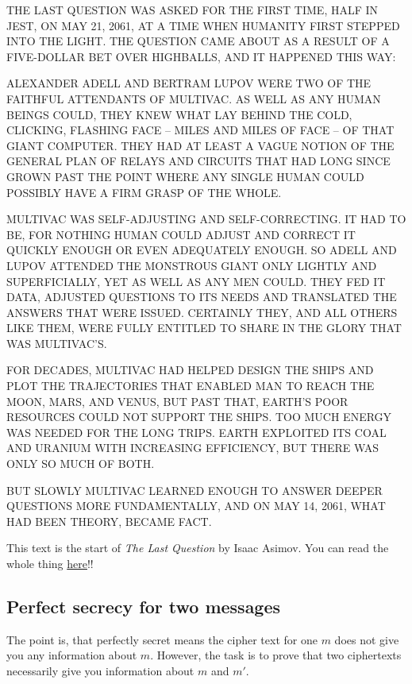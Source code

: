 \documentclass{article}
\begin{document}
  \begin{tcolorbox}[breakable, enhanced jigsaw, colback=Green!5!white, colframe=Green!75!black]
  THE LAST QUESTION WAS ASKED FOR THE FIRST TIME, HALF IN JEST, ON MAY 21, 2061, AT A TIME WHEN HUMANITY FIRST STEPPED INTO THE LIGHT. THE QUESTION CAME ABOUT AS A RESULT OF A FIVE-DOLLAR BET OVER HIGHBALLS, AND IT HAPPENED THIS WAY:

  ALEXANDER ADELL AND BERTRAM LUPOV WERE TWO OF THE FAITHFUL ATTENDANTS OF MULTIVAC. AS WELL AS ANY HUMAN BEINGS COULD, THEY KNEW WHAT LAY BEHIND THE COLD, CLICKING, FLASHING FACE -- MILES AND MILES OF FACE -- OF THAT GIANT COMPUTER. THEY HAD AT LEAST A VAGUE NOTION OF THE GENERAL PLAN OF RELAYS AND CIRCUITS THAT HAD LONG SINCE GROWN PAST THE POINT WHERE ANY SINGLE HUMAN COULD POSSIBLY HAVE A FIRM GRASP OF THE WHOLE.

  MULTIVAC WAS SELF-ADJUSTING AND SELF-CORRECTING. IT HAD TO BE, FOR NOTHING HUMAN COULD ADJUST AND CORRECT IT QUICKLY ENOUGH OR EVEN ADEQUATELY ENOUGH. SO ADELL AND LUPOV ATTENDED THE MONSTROUS GIANT ONLY LIGHTLY AND SUPERFICIALLY, YET AS WELL AS ANY MEN COULD. THEY FED IT DATA, ADJUSTED QUESTIONS TO ITS NEEDS AND TRANSLATED THE ANSWERS THAT WERE ISSUED. CERTAINLY THEY, AND ALL OTHERS LIKE THEM, WERE FULLY ENTITLED TO SHARE IN THE GLORY THAT WAS MULTIVAC'S.

  FOR DECADES, MULTIVAC HAD HELPED DESIGN THE SHIPS AND PLOT THE TRAJECTORIES THAT ENABLED MAN TO REACH THE MOON, MARS, AND VENUS, BUT PAST THAT, EARTH'S POOR RESOURCES COULD NOT SUPPORT THE SHIPS. TOO MUCH ENERGY WAS NEEDED FOR THE LONG TRIPS. EARTH EXPLOITED ITS COAL AND URANIUM WITH INCREASING EFFICIENCY, BUT THERE WAS ONLY SO MUCH OF BOTH.

  BUT SLOWLY MULTIVAC LEARNED ENOUGH TO ANSWER DEEPER QUESTIONS MORE FUNDAMENTALLY, AND ON MAY 14, 2061, WHAT HAD BEEN THEORY, BECAME FACT.
  \end{tcolorbox}

  This text is the start of \textit{The Last Question} by Isaac Asimov.
  You can read the whole thing \href{https://users.ece.cmu.edu/~gamvrosi/thelastq.html}{here}!!

  \subsection{Perfect secrecy for two messages}
  \begin{centerframebox}
    The point is, that perfectly secret means the cipher text for one $m$ does not give you any information about $m$.
    However, the task is to prove that two ciphertexts necessarily give you information about $m$ and $m'$.
  \end{centerframebox}
\end{document}
